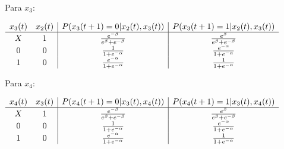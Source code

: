 \documentclass[12pt]{article}
\begin{document}
{Para $x_3$:

$\begin{array}{cc | c | c}
    x_3 (t) &  x_2 (t) &  P (x_3 (t + 1) = 0 | x_2 (t), x_3 (t)) 
                       &  P (x_3 (t + 1) = 1 | x_2 (t), x_3 (t))\\
    \hline
    X     &     1    &     
                          \frac{e^{-\beta}}{e^{\beta} + e^{-\beta}} &
                          \frac{e^{\beta}}{e^{\beta} + e^{-\beta}} \\
    0     &     0    &     
                          \frac{1}{1 + e^{-\alpha}} & 
                          \frac{e^{-\alpha}}{1 + e^{-\alpha}} \\
    1     &     0    &    
                          \frac{e^{-\alpha}}{1 + e^{-\alpha}} & 
                          \frac{1}{1 + e^{-\alpha}} \\
\end{array}$

\bigbreak

Para $x_4$:

$\begin{array}{cc | c | c}
    x_4 (t) &  x_3 (t) &  P (x_4 (t + 1) = 0 | x_3 (t), x_4 (t)) 
                       &  P (x_4 (t + 1) = 1 | x_3 (t), x_4 (t))\\
    \hline
    X     &     1    &     
                          \frac{e^{-\beta}}{e^{\beta} + e^{-\beta}} &
                          \frac{e^{\beta}}{e^{\beta} + e^{-\beta}} \\
    0     &     0    &     
                          \frac{1}{1 + e^{-\alpha}} & 
                          \frac{e^{-\alpha}}{1 + e^{-\alpha}} \\
    1     &     0    &    
                          \frac{e^{-\alpha}}{1 + e^{-\alpha}} & 
                          \frac{1}{1 + e^{-\alpha}} \\
\end{array}$

\bigbreak
}
\end{document}

